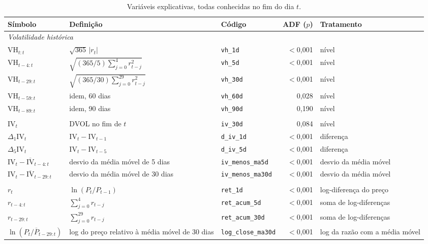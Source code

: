 \begin{table}[H]
\centering
\scriptsize
\caption{Variáveis explicativas, todas conhecidas no fim do dia $t$.}
\label{tab:prev-dicionario}
\begin{tabular}{lp{4.2cm}lrl}
\toprule
Símbolo & Definição & Código & ADF ($p$) & Tratamento \\
\midrule
\multicolumn{5}{l}{\textit{Volatilidade histórica}} \\
$\text{VH}_{t:t}$ & $\sqrt{365}\,|r_t|$ & \texttt{vh\_1d} & $<$0{,}001 & nível \\
$\text{VH}_{t-4:t}$ & $\sqrt{(365/5)\sum_{j=0}^{4} r_{t-j}^2}$ & \texttt{vh\_5d} & $<$0{,}001 & nível \\
$\text{VH}_{t-29:t}$ & $\sqrt{(365/30)\sum_{j=0}^{29} r_{t-j}^2}$ & \texttt{vh\_30d} & $<$0{,}001 & nível \\
$\text{VH}_{t-59:t}$ & idem, 60 dias & \texttt{vh\_60d} & 0{,}028 & nível \\
$\text{VH}_{t-89:t}$ & idem, 90 dias & \texttt{vh\_90d} & 0{,}190 & nível \\
\addlinespace
\multicolumn{5}{l}{\textit{Volatilidade implícita}} \\
$\text{IV}_t$ & DVOL no fim de $t$ & \texttt{iv\_30d} & 0{,}084 & nível \\
$\Delta_1\text{IV}_t$ & $\text{IV}_t - \text{IV}_{t-1}$ & \texttt{d\_iv\_1d} & $<$0{,}001 & diferença \\
$\Delta_5\text{IV}_t$ & $\text{IV}_t - \text{IV}_{t-5}$ & \texttt{d\_iv\_5d} & $<$0{,}001 & diferença \\
$\text{IV}_t - \overline{\text{IV}}_{t-4:t}$ & desvio da média móvel de 5 dias & \texttt{iv\_menos\_ma5d} & $<$0{,}001 & desvio da média móvel \\
$\text{IV}_t - \overline{\text{IV}}_{t-29:t}$ & desvio da média móvel de 30 dias & \texttt{iv\_menos\_ma30d} & $<$0{,}001 & desvio da média móvel \\
\addlinespace
\multicolumn{5}{l}{\textit{Preço}} \\
$r_t$ & $\ln(P_t/P_{t-1})$ & \texttt{ret\_1d} & $<$0{,}001 & log-diferença do preço \\
$r_{t-4:t}$ & $\sum_{j=0}^{4} r_{t-j}$ & \texttt{ret\_acum\_5d} & $<$0{,}001 & soma de log-diferenças \\
$r_{t-29:t}$ & $\sum_{j=0}^{29} r_{t-j}$ & \texttt{ret\_acum\_30d} & $<$0{,}001 & soma de log-diferenças \\
$\ln(P_t/\overline{P}_{t-29:t})$ & log do preço relativo à média móvel de 30 dias & \texttt{log\_close\_ma30d} & $<$0{,}001 & log da razão com a média móvel \\

\end{tabular}
\end{table}
